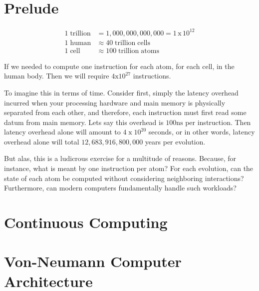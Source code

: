 \section{Prelude}

\begin{equation}
\begin{split}
    1\;\text{trillion} &= 1,000,000,000,000 = 1\,\mathrm{x}\,10^{12}\\
    1\;\text{human} &\approx 40\;\text{trillion}\;\mathrm{cells}\\
    1\;\text{cell} &\approx 100\;\text{trillion}\;\mathrm{atoms}
\end{split}
\end{equation}

If we needed to compute one instruction for each atom, for each cell, in the human body. Then we will require $4 \mathrm{x} 10^{27}$ instructions.

To imagine this in terms of time. Consider first, simply the latency overhead incurred when your processing hardware and main memory is physically separated from each other, and therefore, each instruction must first read some datum from main memory. Lets say this overhead is $100\mathrm{ns}$ per instruction. Then latency overhead alone will amount to $4\;\mathrm{x}\;10^{20}$ seconds, or in other words, latency overhead alone will total $12,683,916,800,000$ years per evolution.

But alas, this is a ludicrous exercise for a multitude of reasons. Because, for instance, what is meant by one instruction per atom? For each evolution, can the state of each atom be computed without considering neighboring interactions? Furthermore, can modern computers fundamentally handle such workloads?





\section{Continuous Computing}
\section{Von-Neumann Computer Architecture}



